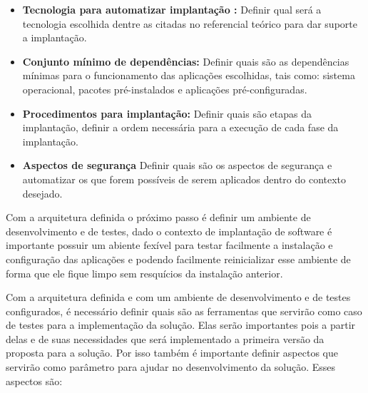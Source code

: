 \begin{itemize}
  \item  \textbf{Tecnologia para automatizar implantação :}  Definir qual será a
  tecnologia escolhida dentre as citadas no referencial teórico para dar suporte
  a implantação.
  \item  \textbf{Conjunto mínimo de dependências:} Definir quais são as dependências
  mínimas para o funcionamento das aplicações escolhidas, tais como: sistema operacional,
  pacotes pré-instalados e aplicações pré-configuradas.
  \item  \textbf{Procedimentos para implantação:} Definir quais são etapas da implantação,
  definir a ordem necessária para a execução de cada fase da implantação.
  \item  \textbf{Aspectos de segurança} Definir quais são os aspectos de segurança
  e automatizar os que forem possíveis de serem aplicados dentro do contexto desejado.
\end{itemize}

Com a arquitetura definida o próximo passo é definir um ambiente de desenvolvimento e de
testes, dado o contexto de implantação de software é importante possuir um abiente fexível para
testar facilmente a instalação e configuração das aplicações e podendo facilmente
reinicializar esse ambiente de forma que ele fique limpo sem resquícios da instalação
anterior.

Com a arquitetura definida e com um ambiente de desenvolvimento e de testes configurados, é
necessário definir quais são as ferramentas que servirão como caso de testes
para a implementação da solução. Elas serão importantes pois a partir delas
e de suas necessidades que será implementado a primeira versão da proposta para
a solução. Por isso também é importante definir aspectos que servirão como parâmetro
para ajudar no desenvolvimento da solução. Esses aspectos são:


